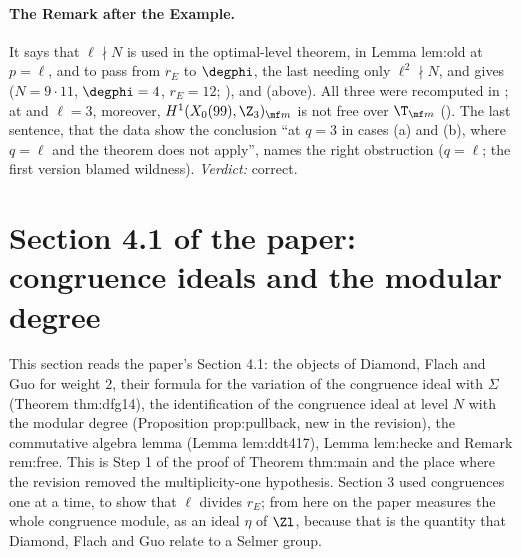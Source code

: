 \begin{sloppypar}
\paragraph{The Remark after the Example.} It says that $\ell\nmid N$ is used in the optimal-level theorem, in Lemma lem:old at $p=\ell$, and to pass from $r_E$ to $\degphi$, the last
needing only $\ell^2\nmid N$, and gives  ($N=9\cdot11$, $\degphi=4$, $r_E=12$; \cite[Table 1]{ARS12}),  and  (above). All three were recomputed in
; at  and $\ell=3$, moreover, $H^1(X_0(99),\Z_3)_{\mf m}$ is not free over $\T_{\mf m}$ (). The last sentence, that the data show the conclusion
``at $q=3$ in cases (a) and (b), where $q=\ell$ and the theorem does not apply'', names the right obstruction ($q=\ell$; the first version blamed wildness).
\emph{Verdict:} correct.

\section[Paper 4.1: congruence ideals]{Section 4.1 of the paper: congruence ideals and the modular degree}\label{sec:paper:congruence-ideals}

This section reads the paper's Section 4.1: the objects of Diamond, Flach and Guo for weight $2$, their formula for the variation of the congruence ideal
with $\Sigma$ (Theorem thm:dfg14), the identification of the congruence ideal at level $N$ with the modular degree (Proposition prop:pullback, new in the
revision), the commutative algebra lemma (Lemma lem:ddt417), Lemma lem:hecke and Remark rem:free. This is Step 1 of the proof of Theorem thm:main and the
place where the revision removed the multiplicity-one hypothesis. Section 3 used congruences one at a time, to show that $\ell$ divides $r_E$; from here on the paper measures
the whole congruence module, as an ideal $\eta$ of $\Zl$, because that is the quantity that Diamond, Flach and Guo relate to a Selmer group.


\end{sloppypar}
